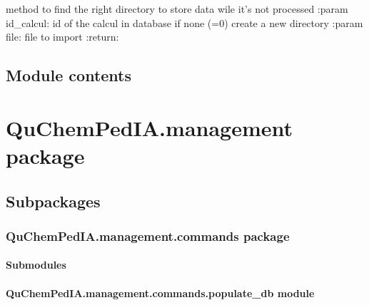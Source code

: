 \documentclass[letterpaper,10pt,english]{sphinxmanual}
\begin{document}
\begin{fulllineitems}
\label{\detokenize{QuChemPedIA.QuChemPedIA_lib:QuChemPedIA.QuChemPedIA_lib.store_in_temp.store_in_temp}}
method to find the right directory to store data wile it’s not processed
:param id\_calcul: id of the calcul in database if none (=0) create a new directory
:param file: file to import
:return:

\end{fulllineitems}



\subsection{Module contents}
\label{\detokenize{QuChemPedIA.QuChemPedIA_lib:module-QuChemPedIA.QuChemPedIA_lib}}\label{\detokenize{QuChemPedIA.QuChemPedIA_lib:module-contents}}

\section{QuChemPedIA.management package}
\label{\detokenize{QuChemPedIA.management:quchempedia-management-package}}\label{\detokenize{QuChemPedIA.management::doc}}

\subsection{Subpackages}
\label{\detokenize{QuChemPedIA.management:subpackages}}

\subsubsection{QuChemPedIA.management.commands package}
\label{\detokenize{QuChemPedIA.management.commands:quchempedia-management-commands-package}}\label{\detokenize{QuChemPedIA.management.commands::doc}}

\paragraph{Submodules}
\label{\detokenize{QuChemPedIA.management.commands:submodules}}

\paragraph{QuChemPedIA.management.commands.populate\_db module}
\label{\detokenize{QuChemPedIA.management.commands:module-QuChemPedIA.management.commands.populate_db}}\label{\detokenize{QuChemPedIA.management.commands:quchempedia-management-commands-populate-db-module}}
\end{document}
